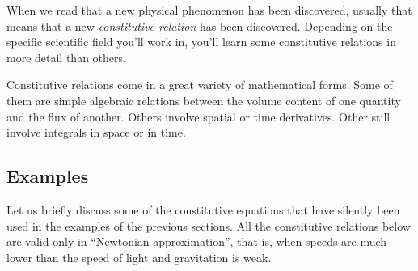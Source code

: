 \documentclass[a4paper,12pt,%
onecolumn,oneside,titlepage,%
british%
]{memoir}
\renewcommand*{\|}[1][]{\nonscript\:#1\vert\nonscript\:\mathopen{}}
\begin{document}
When we read that a new physical phenomenon has been discovered, usually that means that a new \emph{constitutive relation} has been discovered. Depending on the specific scientific field you'll work in, you'll learn some constitutive relations in more detail than others.

Constitutive relations come in a great variety of mathematical forms. Some of them are simple algebraic relations between the volume content of one quantity and the flux of another. Others involve spatial or time derivatives. Other still involve integrals in space or in time.%

\subsection{Examples}
\label{sec:example_constitutive}

Let us briefly discuss some of the constitutive equations that have silently been used in the examples of the previous sections. All the constitutive relations below are valid only in \enquote{Newtonian approximation}, that is, when speeds are much lower than the speed of light and gravitation is weak.
\end{document}
